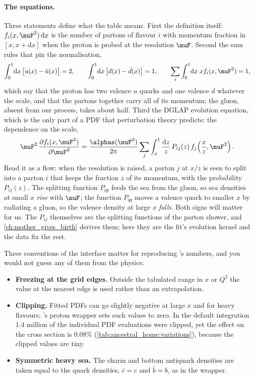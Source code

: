 \paragraph{The equations.} Three statements define what the table means.
First the definition itself: $f_i(x,\muF^2)\,\mathrm{d}x$ is the number of
partons of flavour $i$ with momentum fraction in $[x,x+\mathrm{d}x]$ when the
proton is probed at the resolution $\muF$. Second the sum rules that pin the
normalisation,
\begin{equation}
  \int_0^1\!\mathrm{d}x\,\bigl[u(x)-\bar u(x)\bigr]=2,\qquad
  \int_0^1\!\mathrm{d}x\,\bigl[d(x)-\bar d(x)\bigr]=1,\qquad
  \sum_i\int_0^1\!\mathrm{d}x\;x f_i(x,\muF^2)=1 ,
  \label{eq:ancestral_home:sumrules}
\end{equation}
which say that the proton has two valence $u$ quarks and one valence $d$
whatever the scale, and that the partons together carry all of its momentum;
the gluon, absent from our process, takes about half. Third the DGLAP
evolution equation, which is the only part of a PDF that perturbation theory
predicts: the dependence on the scale,
\begin{equation}
  \muF^2\,\frac{\partial f_i(x,\muF^2)}{\partial\muF^2}
  =\frac{\alphas(\muF^2)}{2\pi}\sum_j\int_x^1\frac{\mathrm{d}z}{z}\,
  P_{ij}(z)\,f_j\!\left(\frac{x}{z},\muF^2\right).
  \label{eq:ancestral_home:dglap}
\end{equation}
Read it as a flow: when the resolution is raised, a parton $j$ at $x/z$ is
seen to split into a parton $i$ that keeps the fraction $z$ of its momentum,
with the probability $P_{ij}(z)$. The splitting function $P_{qg}$ feeds the
sea from the gluon, so sea densities at small $x$ \emph{rise} with $\muF$;
the function $P_{qq}$ moves a valence quark to smaller $x$ by radiating a
gluon, so the valence density at large $x$ \emph{falls}. Both signs will
matter for us. The $P_{ij}$ themselves are the splitting functions of the
parton shower, and \cref{ch:mother_gives_birth} derives them; here they
are the fit's evolution kernel and the data fix the rest.

Three conventions of the interface matter for reproducing \PYTHIA's numbers,
and you would not guess any of them from the physics:
\begin{itemize}[nosep]
  \item \textbf{Freezing at the grid edges.} Outside the tabulated range in
    $x$ or $Q^2$ the value at the nearest edge is used rather than an
    extrapolation.
  \item \textbf{Clipping.} Fitted PDFs can go slightly negative at large $x$
    and for heavy flavours; \PYTHIA's proton wrapper sets such values to zero.
    In the default integration $1.4$ million of the individual PDF evaluations
    were clipped, yet the effect on the cross section is $0.08\%$
    (\cref{tab:ancestral_home:variations}), because the clipped values are tiny.
  \item \textbf{Symmetric heavy sea.} The charm and bottom antiquark
    densities are taken equal to the quark densities, $\bar c=c$ and
    $\bar b=b$, as in the wrapper.
\end{itemize}

